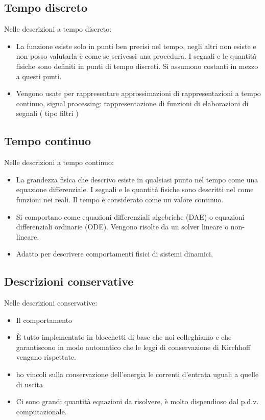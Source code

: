 \documentclass[a4paper]{article}
\theoremstyle{definition}
\begin{document}
		\subsection{Tempo discreto} 
		Nelle descrizioni a tempo discreto:
		\begin{itemize}
			\item La funzione esiste solo in punti ben precisi nel tempo, negli altri non esiste e non posso valutarla
			è come se scrivessi una procedura. I segnali e le quantità fisiche sono definiti in punti di tempo discreti. Si assumono costanti in mezzo a questi punti.
			\item Vengono usate per rappresentare approssimazioni di rappresentazioni a tempo continuo, 
			signal processing: rappresentazione di funzioni di elaborazioni di segnali ( tipo filtri )
		\end{itemize}
		
		
		\subsection{Tempo continuo}
		Nelle descrizioni a tempo continuo:
		\begin{itemize}
			\item La grandezza fisica che descrivo esiste in qualsiasi punto nel tempo
			come una equazione differenziale. I segnali e le quantità fisiche sono descritti nel come funzioni nei reali. Il tempo è considerato come un valore continuo.
			\item Si comportano come equazioni differenziali algebriche (DAE) o equazioni differenziali ordinarie (ODE). Vengono risolte da un solver lineare o non-lineare.
			\item Adatto per descrivere comportamenti fisici di sistemi dinamici,
		\end{itemize}
		
		\subsection{Descrizioni conservative}
		Nelle descrizioni conservative:
		\begin{itemize}
			\item Il comportamento 
			\item È tutto implementato in blocchetti di base che noi colleghiamo e che garantiscono in modo automatico che le leggi di conservazione di Kirchhoff vengano rispettate.
			\item ho vincoli sulla conservazione dell'energia
			le correnti d'entrata uguali a quelle di uscita
			\item Ci sono grandi quantità equazioni da risolvere, è molto dispendioso dal p.d.v. computazionale.
		\end{itemize}
		
\end{document}
